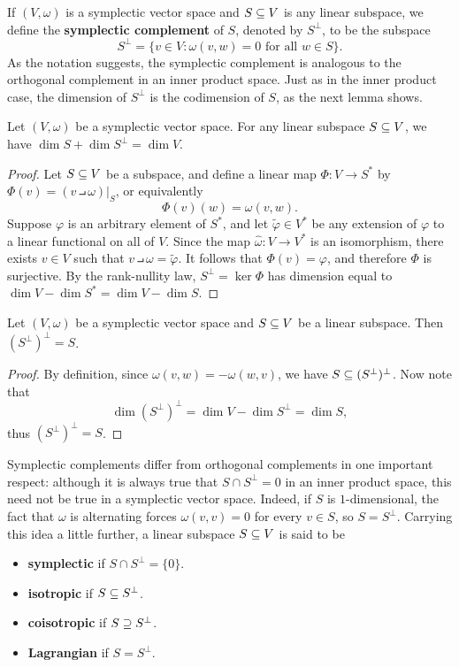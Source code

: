 If $(V,\omega)$ is a symplectic vector space and $S\subseteq V$ is any linear subspace, we define the \textbf{symplectic complement} of $S$, denoted by $S^\bot$, to be the subspace
\[S^\bot=\{v\in V:\omega(v,w)=0\text{ for all $w\in S$}\}.\]
As the notation suggests, the symplectic complement is analogous to the orthogonal complement in an inner product space. Just as in the inner product case, the dimension of $S^\bot$ is the codimension of $S$, as the next lemma shows.
\begin{lemma}\label{symplectic complement dim}
Let $(V,\omega)$ be a symplectic vector space. For any linear subspace
$S\subseteq V$, we have $\dim S+\dim S^\bot=\dim V$.
\end{lemma}
\begin{proof}
Let $S\subseteq V$ be a subspace, and define a linear map $\varPhi:V\to S^*$ by $\varPhi(v)=(v\intprod\omega)|_S$, or equivalently
\[\varPhi(v)(w)=\omega(v,w).\]
Suppose $\varphi$ is an arbitrary element of $S^*$, and let $\widetilde{\varphi}\in V^*$ be any extension of $\varphi$ to a linear functional on all of $V$. Since the map $\widehat{\omega}:V\to V^*$ is an isomorphism, there exists $v\in V$ such that $v\intprod\omega=\widetilde{\varphi}$. It follows that $\varPhi(v)=\varphi$, and therefore $\varPhi$ is surjective. By the rank-nullity law, $S^\bot=\ker\varPhi$ has dimension equal to $\dim V-\dim S^*=\dim V-\dim S$.
\end{proof}
\begin{proposition}
Let $(V,\omega)$ be a symplectic vector space and $S\subseteq V$ be a linear subspace. Then $(S^\bot)^\bot=S$.
\end{proposition}
\begin{proof}
By definition, since $\omega(v,w)=-\omega(w,v)$, we have $S\subseteq(S^\bot)^\bot$. Now note that
\[\dim(S^\bot)^\bot=\dim V-\dim S^\bot=\dim S,\]
thus $(S^\bot)^\bot=S$.
\end{proof}
Symplectic complements differ from orthogonal complements in one important respect: although it is always true that $S\cap S^\bot=0$ in an inner product space, this need not be true in a symplectic vector space. Indeed, if $S$ is $1$-dimensional, the fact that $\omega$ is alternating forces $\omega(v,v)=0$ for every $v\in S$, so $S=S^\bot$. Carrying this idea a little further, a linear subspace $S\subseteq V$ is said to be
\begin{itemize}
\item \textbf{symplectic} if $S\cap S^\bot=\{0\}$.
\item \textbf{isotropic} if $S\subseteq S^\bot$.
\item \textbf{coisotropic} if $S\supseteq S^\bot$.
\item \textbf{Lagrangian} if $S=S^\bot$.
\end{itemize}
